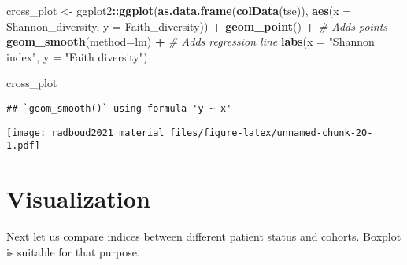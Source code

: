 \documentclass[
  oneside]{book}
\newenvironment{Shaded}{\begin{snugshade}}{\end{snugshade}}
\newcommand{\CommentTok}[1]{\textcolor[rgb]{0.56,0.35,0.01}{\textit{#1}}}
\newcommand{\DataTypeTok}[1]{\textcolor[rgb]{0.13,0.29,0.53}{#1}}
\newcommand{\KeywordTok}[1]{\textcolor[rgb]{0.13,0.29,0.53}{\textbf{#1}}}
\newcommand{\NormalTok}[1]{#1}
\newcommand{\OperatorTok}[1]{\textcolor[rgb]{0.81,0.36,0.00}{\textbf{#1}}}
\newcommand{\StringTok}[1]{\textcolor[rgb]{0.31,0.60,0.02}{#1}}
\begin{document}
\begin{Shaded}
\begin{Highlighting}[]
\NormalTok{cross_plot <-}\StringTok{ }\NormalTok{ggplot2}\OperatorTok{::}\KeywordTok{ggplot}\NormalTok{(}\KeywordTok{as.data.frame}\NormalTok{(}\KeywordTok{colData}\NormalTok{(tse)), }
                                     \KeywordTok{aes}\NormalTok{(}\DataTypeTok{x =}\NormalTok{ Shannon_diversity, }\DataTypeTok{y =}\NormalTok{ Faith_diversity)) }\OperatorTok{+}\StringTok{ }
\StringTok{  }\KeywordTok{geom_point}\NormalTok{() }\OperatorTok{+}\StringTok{ }\CommentTok{# Adds points}
\StringTok{  }\KeywordTok{geom_smooth}\NormalTok{(}\DataTypeTok{method=}\NormalTok{lm) }\OperatorTok{+}\StringTok{ }\CommentTok{# Adds regression line}
\StringTok{  }\KeywordTok{labs}\NormalTok{(}\DataTypeTok{x =} \StringTok{"Shannon index"}\NormalTok{, }\DataTypeTok{y =} \StringTok{"Faith diversity"}\NormalTok{) }

\NormalTok{cross_plot}
\end{Highlighting}
\end{Shaded}

\begin{verbatim}
## `geom_smooth()` using formula 'y ~ x'
\end{verbatim}

\texttt{[image: radboud2021\_material\_files/figure-latex/unnamed-chunk-20-1.pdf]}

\hypertarget{visualization}{%
\section{Visualization}\label{visualization}}

Next let us compare indices between different patient status and
cohorts. Boxplot is suitable for that purpose.
\end{document}
